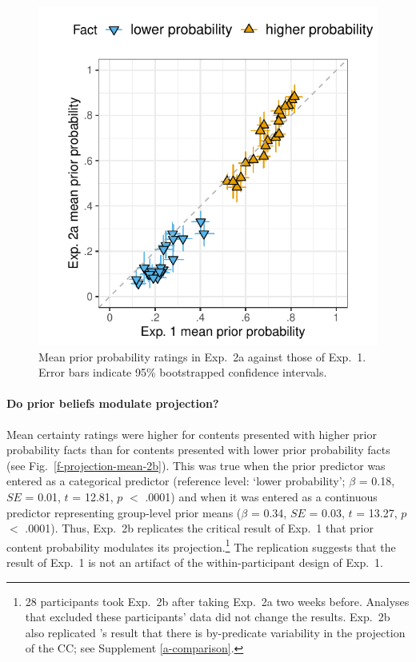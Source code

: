\documentclass[11pt,fleqn]{article}
\newcommand{\figref}[1]{Fig.~\ref{#1}}
\newcommand{\6}{\mbox{$[\hspace*{-.6mm}[$}}
\newcommand{\9}{\mbox{$]\hspace*{-.6mm}]$}}
\newcommand{\citepos}[1]{\citeauthor{#1}'s \citeyear{#1}}
\begin{document}
\begin{figure}[h!]
\centering

\includegraphics[width=.4\paperwidth]{../../results/1-prior/graphs/prior-probability-comparison-exp1-exp2}

\caption{Mean prior probability ratings in Exp.~2a against those of Exp.~1. Error bars indicate 95\% bootstrapped confidence intervals.}
\label{f-prior-comparison}
\end{figure}


\paragraph{Do prior beliefs modulate projection?} Mean certainty ratings were higher for contents  presented with higher prior probability facts than for contents presented with lower prior probability facts (see \figref{f-projection-mean-2b}). This was true when the prior predictor was entered as a categorical predictor (reference level: `lower probability'; $\beta$ = 0.18, $SE$ = 0.01, $t$ = 12.81, $p$ $<$ .0001) and when it was entered as a continuous predictor representing group-level prior means ($\beta$ = 0.34, $SE$ = 0.03, $t$ = 13.27, $p$ $<$ .0001). Thus, Exp.~2b replicates the critical result of Exp.~1 that prior content probability modulates its projection.\footnote{28 participants took Exp.~2b after taking Exp.~2a two weeks before. Analyses that excluded these participants' data did not change the results. Exp.~2b also replicated \citepos{tonhauser-degen-factive} result that there is by-predicate variability in the projection of the CC; see Supplement \ref{a-comparison}.}  The replication suggests that the result of Exp.~1 is not an artifact of the within-participant design of Exp.~1.
\end{document}
